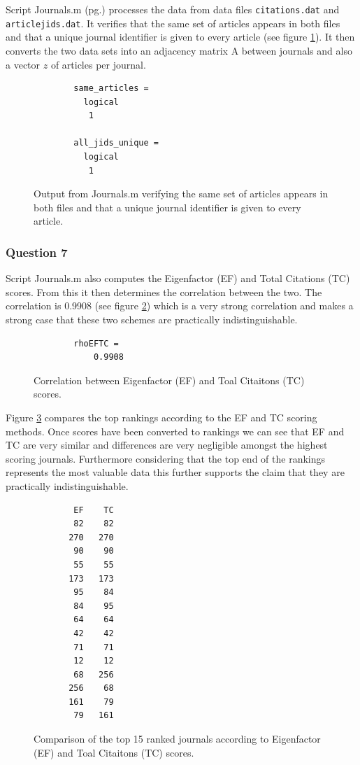 \documentclass[a4paper]{article}
\begin{document}
Script Journals.m (pg.\pageref{Pjournals}) processes the data from data files \texttt{citations.dat} and \texttt{articlejids.dat}. It verifies that the same set of articles appears in both files and that a unique journal identifier is given to every article (see figure \ref{fig:q6}). It then converts the two data sets into an adjacency matrix A between journals and also a vector $z$ of articles per journal.
\begin{figure}[H]
    \centering
    \begin{verbatim}
        same_articles =
          logical
           1
        
        all_jids_unique =
          logical
           1
    \end{verbatim}
    \caption{Output from Journals.m verifying the same set of articles appears in both files and that a unique journal identifier is given to every article.}
    \label{fig:q6}
\end{figure}

\subsubsection*{Question 7}

Script Journals.m also computes the Eigenfactor (EF) and Total Citations (TC) scores. From this it then determines the correlation between the two. The correlation is 0.9908 (see figure \ref{fig:q7cor}) which is a very strong correlation and makes a strong case that these two schemes are practically indistinguishable.

\begin{figure}[H]
    \centering
    \begin{verbatim}
        rhoEFTC =
            0.9908
    \end{verbatim}
    \caption{Correlation between Eigenfactor (EF) and Toal Citaitons (TC) scores.}
    \label{fig:q7cor}
\end{figure}

Figure \ref{fig:q7rank} compares the top rankings according to the EF and TC scoring methods. Once scores have been converted to rankings we can see that EF and TC are very similar and differences are very negligible amongst the highest scoring journals. Furthermore considering that the top end of the rankings represents the most valuable data this further supports the claim that they are practically indistinguishable.
\begin{figure}[H]
    \centering
    \begin{verbatim}
        EF    TC
        82    82
       270   270
        90    90
        55    55
       173   173
        95    84
        84    95
        64    64
        42    42
        71    71
        12    12
        68   256
       256    68
       161    79
        79   161
    \end{verbatim}
    \caption{Comparison of the top 15 ranked journals according to Eigenfactor (EF) and Toal Citaitons (TC) scores.}
    \label{fig:q7rank}
\end{figure}
\end{document}
